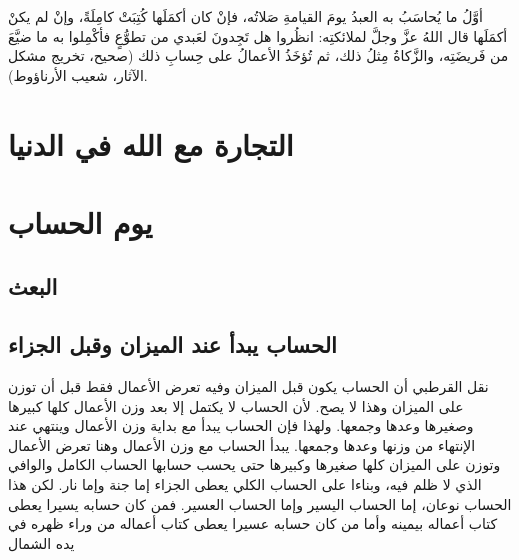 أوَّلُ ما يُحاسَبُ به العبدُ يومَ القيامةِ صَلاتُه، فإنْ كان أكمَلَها كُتِبَتْ كامِلَةً، وإنْ لم يكنْ أكمَلَها قال اللهُ عزَّ وجلَّ لملائكتِه: انظُروا هل تَجِدونَ لعَبدي من تطوُّعٍ فأكْمِلوا به ما ضيَّعَ من فَريضَتِه، والزَّكاةُ مِثلُ ذلك، ثم تُؤخَذُ الأعمالُ على حِسابِ ذلك {\footnotesize (صحيح، تخريج مشكل الآثار، شعيب الأرناؤوط)}.

\section{التجارة مع الله في الدنيا}

\section{يوم الحساب}

\subsection{البعث}


\subsection{الحساب يبدأ عند الميزان وقبل الجزاء}


نقل القرطبي أن الحساب يكون قبل الميزان وفيه تعرض الأعمال فقط قبل أن توزن على الميزان وهذا لا يصح. لأن الحساب لا يكتمل إلا بعد وزن الأعمال كلها كبيرها وصغيرها وعدها وجمعها. ولهذا فإن الحساب يبدأ مع بداية وزن الأعمال وينتهي عند الإنتهاء من وزنها وعدها وجمعها. يبدأ الحساب مع وزن الأعمال وهنا تعرض الأعمال وتوزن على الميزان كلها صغيرها وكبيرها حتى يحسب حسابها الحساب الكامل والوافي الذي لا ظلم فيه، وبناءا على الحساب الكلي يعطى الجزاء إما جنة وإما نار. لكن هذا الحساب نوعان، إما الحساب اليسير وإما الحساب العسير. فمن كان حسابه يسيرا يعطى كتاب أعماله بيمينه وأما من كان حسابه عسيرا يعطى كتاب أعماله من وراء ظهره في يده الشمال 

